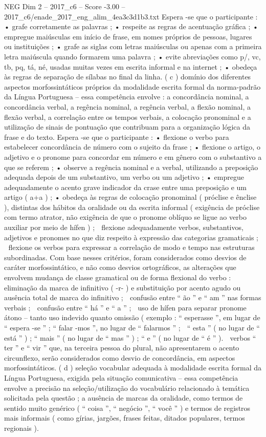 \begin{textsample}{NEG Dim 2 – 2017\_c6 – Score -3.00 – 2017\_c6/enade\_2017\_eng\_alim\_4ea3c3d1b3.txt}
Espera -se que o participante : • grafe corretamente as palavras ; • respeite as regras de acentuação gráfica ; • empregue maiúsculas em início de frase, em nomes próprios de pessoas, lugares ou instituições ; • grafe as siglas com letras maiúsculas ou apenas com a primeira letra maiúscula quando formarem uma palavra ; • evite abreviações como p/, vc, tb, pq, tá, né, usadas muitas vezes em escrita informal e na internet ; • obedeça às regras de separação de sílabas no final da linha. ( c ) domínio dos diferentes aspectos morfossintáticos próprios da modalidade escrita formal da norma-padrão da Língua Portuguesa – essa competência envolve : a concordância nominal, a concordância verbal, a regência nominal, a regência verbal, a flexão nominal, a flexão verbal, a correlação entre os tempos verbais, a colocação pronominal e a utilização de sinais de pontuação que contribuam para a organização lógica da frase e do texto.
Espera -se que o participante : • flexione o verbo para estabelecer concordância de número com o sujeito da frase ; • flexione o artigo, o adjetivo e o pronome para concordar em número e em gênero com o substantivo a que se referem ; • observe a regência nominal e a verbal, utilizando a preposição adequada depois de um substantivo, um verbo ou um adjetivo ; • empregue adequadamente o acento grave indicador da crase entre uma preposição e um artigo ( a+a ) ; • obedeça às regras de colocação pronominal ( próclise e ênclise ), distintas dos hábitos da oralidade ou da escrita informal ( exigência de próclise com termo atrator, não exigência de que o pronome oblíquo se ligue ao verbo auxiliar por meio de hífen ) ;  flexione adequadamente verbos, substantivos, adjetivos e pronomes no que diz respeito à expressão das categorias gramaticais ;  flexione os verbos para expressar a correlação de modo e tempo nas estruturas subordinadas.
Com base nesses critérios, foram considerados como desvios de caráter morfossintático, e não como desvios ortográficos, as alterações que envolvem mudança de classe gramatical ou de forma flexional do verbo :  eliminação da marca de infinitivo ( -r- ) e substituição por acento agudo ou ausência total de marca do infinitivo ;  confusão entre “ ão ” e “ am ” nas formas verbais ;  confusão entre “ há ” e “ a ” ;  uso de hífen para separar pronome átono – tanto uso indevido quanto omissão ( exemplo : “ esperasse ”, em lugar de “ espera -se ” ; “ falar -mos ”, no lugar de “ falarmos ” ;  “ esta ” ( no lugar de “ está ” ) ; “ mais ” ( no lugar de “ mas ” ) ; “ e ” ( no lugar de “ é ” ).  verbos “ ter ” e “ vir ” que, na terceira pessoa do plural, não apresentarem o acento circunflexo, serão considerados como desvio de concordância, em aspectos morfossintáticos. ( d ) seleção vocabular adequada à modalidade escrita formal da Língua Portuguesa, exigida pela situação comunicativa – essa competência envolve a precisão na seleção/utilização do vocabulário relacionado à temática solicitada pela questão ; a ausência de marcas da oralidade, como termos de sentido muito genérico ( “ coisa ”, “ negócio ”, “ você ” ) e termos de registros mais informais ( como gírias, jargões, frases feitas, ditados populares, termos regionais ).

\end{textsample}
